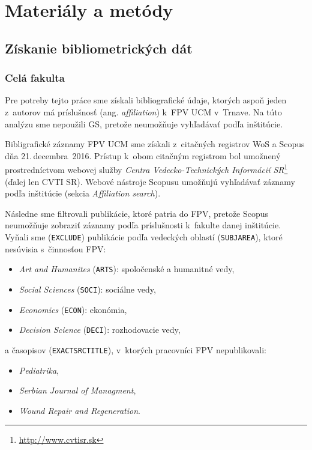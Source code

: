 \chapter{Materiály a metódy}

\section{Získanie bibliometrických dát}

\subsection{Celá fakulta}
\label{sec.all.mining}

Pre potreby tejto práce sme získali bibliografické údaje, ktorých aspoň jeden
z~autorov má príslušnosť (ang. \emph{affiliation}) k~FPV UCM v~Trnave. Na túto
analýzu sme nepoužili GS, pretože neumožňuje vyhľadávať podľa inštitúcie.

Bibligrafické záznamy FPV UCM sme získali z~citačných registrov WoS a Scopus dňa
21.\,decembra~2016.  Prístup k~obom citačným registrom bol umožnený
prostredníctvom webovej služby \emph{Centra Vedecko-Technických Informácií
  SR}\footnote{\url{http://www.cvtisr.sk}} (ďalej len CVTI SR).  Webové nástroje
Scopusu umožňujú vyhľadávať záznamy podľa inštitúcie (sekcia \emph{Affiliation
  search}).

Následne sme filtrovali publikácie, ktoré patria do FPV, pretože Scopus
neumožňuje zobraziť záznamy podľa príslušnosti k~fakulte danej inštitúcie.
Vyňali sme (\texttt{EXCLUDE}) publikácie podľa vedeckých oblastí
(\texttt{SUBJAREA}), ktoré nesúvisia s~činnosťou FPV:

\begin{itemize}
\item \emph{Art and Humanites} (\texttt{ARTS}): spoločenské a humanitné vedy,
\item \emph{Social Sciences} (\texttt{SOCI}): sociálne vedy,
\item \emph{Economics} (\texttt{ECON}): ekonómia,
\item \emph{Decision Science} (\texttt{DECI}): rozhodovacie vedy,
\end{itemize}
a časopisov (\texttt{EXACTSRCTITLE}), v~ktorých pracovníci FPV nepublikovali:

\begin{itemize}
\item \emph{Pediatrika},
\item \emph{Serbian Journal of Managment},
\item \emph{Wound Repair and Regeneration}.
\end{itemize}

